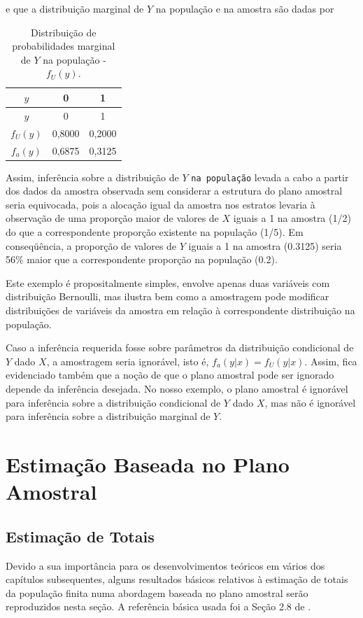 \documentclass[]{book}
\theoremstyle{definition}
\theoremstyle{definition}
\theoremstyle{definition}
\theoremstyle{remark}
\begin{document}
e que a distribuição marginal de \(Y\) na população e na amostra são
dadas por

\begin{longtable}[]{@{}ccc@{}}
\caption{\label{tab:Tab28} Distribuição de probabilidades marginal de \(Y\)
na população - \(f_U( y )\).}\tabularnewline
\toprule
\(y\) & 0 & 1\tabularnewline
\midrule
\endfirsthead
\toprule
\(y\) & 0 & 1\tabularnewline
\midrule
\endhead
\(f_U(y)\) & 0,8000 & 0,2000\tabularnewline
\(f_a(y)\) & 0,6875 & 0,3125\tabularnewline
\bottomrule
\end{longtable}

Assim, inferência sobre a distribuição de \(Y\) \texttt{na\ população}
levada a cabo a partir dos dados da amostra observada sem considerar a
estrutura do plano amostral seria equivocada, pois a alocação igual da
amostra nos estratos levaria à observação de uma proporção maior de
valores de \(X\) iguais a 1 na amostra (1/2) do que a correspondente
proporção existente na população (1/5). Em conseqüência, a proporção de
valores de \(Y\) iguais a 1 na amostra (0.3125) seria 56\% maior que a
correspondente proporção na população (0.2).

Este exemplo é propositalmente simples, envolve apenas duas variáveis
com distribuição Bernoulli, mas ilustra bem como a amostragem pode
modificar distribuições de variáveis da amostra em relação à
correspondente distribuição na população.

Caso a inferência requerida fosse sobre parâmetros da distribuição
condicional de \(Y\) dado \(X\), a amostragem seria ignorável, isto é,
\(f_a ( y | x) = f_U (y | x)\). Assim, fica evidenciado também que a
noção de que o plano amostral pode ser ignorado depende da inferência
desejada. No nosso exemplo, o plano amostral é ignorável para inferência
sobre a distribuição condicional de \(Y\) dado \(X\), mas não é
ignorável para inferência sobre a distribuição marginal de \(Y\).

\chapter{Estimação Baseada no Plano Amostral}\label{capplanamo}

\section{Estimação de Totais}\label{estimatotais}

Devido a sua importância para os desenvolvimentos teóricos em vários dos
capítulos subsequentes, alguns resultados básicos relativos à estimação
de totais da população finita numa abordagem baseada no plano amostral
serão reproduzidos nesta seção. A referência básica usada foi a Seção
2.8 de \citep{SSW92}.
\end{document}
